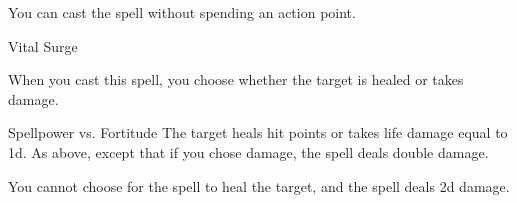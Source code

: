 You can cast the spell without spending an action point.
\begin{spellsection}{Vital Surge}
\begin{spellcontent}
\begin{spelltargetinginfo}
\end{spelltargetinginfo}
\begin{spelleffects}
\spellspecial
When you cast this spell, you choose whether the target is healed or takes damage.
\begin{spellattack}{Spellpower vs. Fortitude}
\spellsuccess The target heals hit points or takes life damage equal to  \plus1d.
\spellcritical As above, except that if you chose damage, the spell deals double damage.
\end{spellattack}
\end{spelleffects}
\end{spellcontent}
\begin{spellfooter}
\end{spellfooter}
\begin{spellsubcontent}
\begin{spellcantrip}
You cannot choose for the spell to heal the target, and the spell deals \minus2d damage.
\end{spellcantrip}
\end{spellsubcontent}
\end{spellsection}
